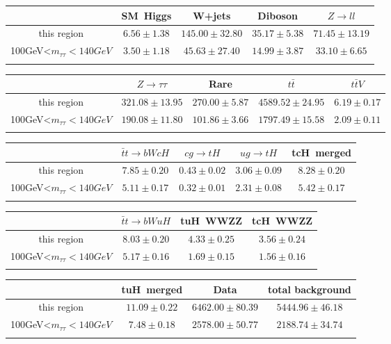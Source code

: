 \centering
\begin{tabular}{ccccc} \toprule\toprule
 & SM~Higgs & W+jets & Diboson & $Z\to ll$\\\midrule
this region & $6.56\pm1.38$ & $145.00\pm32.80$ & $35.17\pm5.38$ & $71.45\pm13.19$\\
100GeV<$m_{\tau\tau}<140GeV$ & $3.50\pm1.18$ & $45.63\pm27.40$ & $14.99\pm3.87$ & $33.10\pm6.65$\\
\bottomrule\bottomrule\\
\end{tabular}
\begin{tabular}{ccccc} \toprule\toprule
 & $Z\to \tau\tau$ & Rare & $t\bar{t}$ & $t\bar{t}V$\\\midrule
this region & $321.08\pm13.95$ & $270.00\pm5.87$ & $4589.52\pm24.95$ & $6.19\pm0.17$\\
100GeV<$m_{\tau\tau}<140GeV$ & $190.08\pm11.80$ & $101.86\pm3.66$ & $1797.49\pm15.58$ & $2.09\pm0.11$\\
\bottomrule\bottomrule\\
\end{tabular}
\begin{tabular}{ccccc} \toprule\toprule
 & $\bar{t}t\to bWcH$ & $cg\to tH$ & $ug\to tH$ & tcH~merged\\\midrule
this region & $7.85\pm0.20$ & $0.43\pm0.02$ & $3.06\pm0.09$ & $8.28\pm0.20$\\
100GeV<$m_{\tau\tau}<140GeV$ & $5.11\pm0.17$ & $0.32\pm0.01$ & $2.31\pm0.08$ & $5.42\pm0.17$\\
\bottomrule\bottomrule\\
\end{tabular}
\begin{tabular}{cccc} \toprule\toprule
 & $\bar{t}t\to bWuH$ & tuH~WWZZ & tcH~WWZZ\\\midrule
this region & $8.03\pm0.20$ & $4.33\pm0.25$ & $3.56\pm0.24$\\
100GeV<$m_{\tau\tau}<140GeV$ & $5.17\pm0.16$ & $1.69\pm0.15$ & $1.56\pm0.16$\\
\bottomrule\bottomrule\\
\end{tabular}
\begin{tabular}{cccc} \toprule\toprule
 & tuH~merged & Data & total background\\\midrule
this region & $11.09\pm0.22$ & $6462.00\pm80.39$ & $5444.96\pm46.18$\\
100GeV<$m_{\tau\tau}<140GeV$ & $7.48\pm0.18$ & $2578.00\pm50.77$ & $2188.74\pm34.74$\\
\bottomrule\bottomrule\\
\end{tabular}

